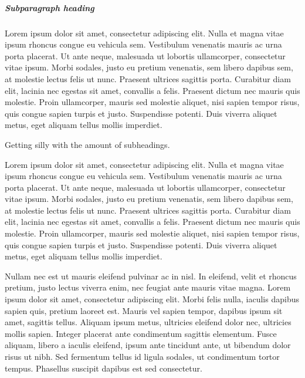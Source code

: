 \documentclass[doc,longtable]{apa6}
\begin{document}
\subparagraph{Subparagraph heading}\label{subparagraph-heading}

Lorem ipsum dolor sit amet, consectetur adipiscing elit. Nulla et magna vitae ipsum rhoncus congue eu vehicula sem. Vestibulum venenatis mauris ac urna porta placerat. Ut ante neque, malesuada ut lobortis ullamcorper, consectetur vitae ipsum. Morbi sodales, justo eu pretium venenatis, sem libero dapibus sem, at molestie lectus felis ut nunc. Praesent ultrices sagittis porta. Curabitur diam elit, lacinia nec egestas sit amet, convallis a felis. Praesent dictum nec mauris quis molestie. Proin ullamcorper, mauris sed molestie aliquet, nisi sapien tempor risus, quis congue sapien turpis et justo. Suspendisse potenti. Duis viverra aliquet metus, eget aliquam tellus mollis imperdiet.

Getting silly with the amount of subheadings.

Lorem ipsum dolor sit amet, consectetur adipiscing elit. Nulla et magna vitae ipsum rhoncus congue eu vehicula sem. Vestibulum venenatis mauris ac urna porta placerat. Ut ante neque, malesuada ut lobortis ullamcorper, consectetur vitae ipsum. Morbi sodales, justo eu pretium venenatis, sem libero dapibus sem, at molestie lectus felis ut nunc. Praesent ultrices sagittis porta. Curabitur diam elit, lacinia nec egestas sit amet, convallis a felis. Praesent dictum nec mauris quis molestie. Proin ullamcorper, mauris sed molestie aliquet, nisi sapien tempor risus, quis congue sapien turpis et justo. Suspendisse potenti. Duis viverra aliquet metus, eget aliquam tellus mollis imperdiet.

Nullam nec est ut mauris eleifend pulvinar ac in nisl. In eleifend, velit et rhoncus pretium, justo lectus viverra enim, nec feugiat ante mauris vitae magna. Lorem ipsum dolor sit amet, consectetur adipiscing elit. Morbi felis nulla, iaculis dapibus sapien quis, pretium laoreet est. Mauris vel sapien tempor, dapibus ipsum sit amet, sagittis tellus. Aliquam ipsum metus, ultricies eleifend dolor nec, ultricies mollis sapien. Integer placerat ante condimentum sagittis elementum. Fusce aliquam, libero a iaculis eleifend, ipsum ante tincidunt ante, ut bibendum dolor risus ut nibh. Sed fermentum tellus id ligula sodales, ut condimentum tortor tempus. Phasellus suscipit dapibus est sed consectetur.

\newpage

\printbibliography[title=References]
\end{document}
